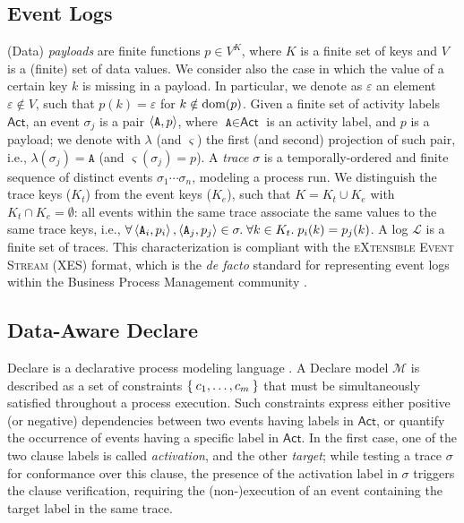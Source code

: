 \subsection{Event Logs}\label{ssec:elog}
(Data) \textit{payloads} are finite functions $p\in V^K$, where $K$ is a finite set of keys and $V$ is a (finite) set of data values. We consider also the case in which the value of a certain key $k$ is missing in a payload. In particular, we denote as $\varepsilon$ an element $\varepsilon\notin V$, such that $p(k)=\varepsilon$ for $k\notin\textup{dom}(p)$. Given a finite set of activity labels $\textsf{Act}$, an event $\sigma_j$ is a pair $\Braket{\texttt{A},p}$, where $\texttt{A}\in\textsf{Act}$ is an activity label, and $p$ is a payload; we denote with $\lambda$ (and $\varsigma$) the first (and second) projection of such pair, i.e., $\lambda(\sigma_j)=\texttt{A}$ (and $\varsigma(\sigma_j)=p$). A \textit{trace} $\sigma$ is a temporally-ordered and finite sequence of distinct events $\sigma_1\cdots\sigma_n$, modeling a process run. We distinguish the trace keys ($K_t$) from the event keys ($K_e$), such that $K=K_t\cup K_e$ with $K_t\cap K_e=\emptyset$: all events within the same trace associate the same values to the same trace keys, i.e., $\forall \Braket{\texttt{A}_i,p_i},\Braket{\texttt{A}_j,p_j}\in\sigma.\;\forall k\in K_t.\; p_i(k)=p_j(k)$. A log $\mathcal{L}$ is a finite set of traces. This  characterization is compliant with the \textsc{eXtensible Event Stream} (XES) format, which is the \textit{de facto} standard for representing event logs within the Business Process Management community \cite{XES}.


\subsection{Data-Aware Declare}\label{ssec:dad}
Declare is a declarative process modeling language \cite{DBLP:conf/edoc/PesicSA07}. A Declare model $\mathcal{M}$ is described as a set of constraints $\Set{c_1,\dots,c_m}$ that must be simultaneously satisfied throughout a process execution.
Such constraints express either positive (or negative) dependencies between two events having labels in $\textsf{Act}$, or quantify the occurrence of events having a specific label in $\textsf{Act}$. In the first case, one of the two clause labels is called \textit{activation}, and the other \textit{target}; while testing a trace $\sigma$ for conformance over this clause, the presence of the activation label in $\sigma$ triggers the clause verification, requiring the (non-)execution of an event containing the target label in the same trace.

